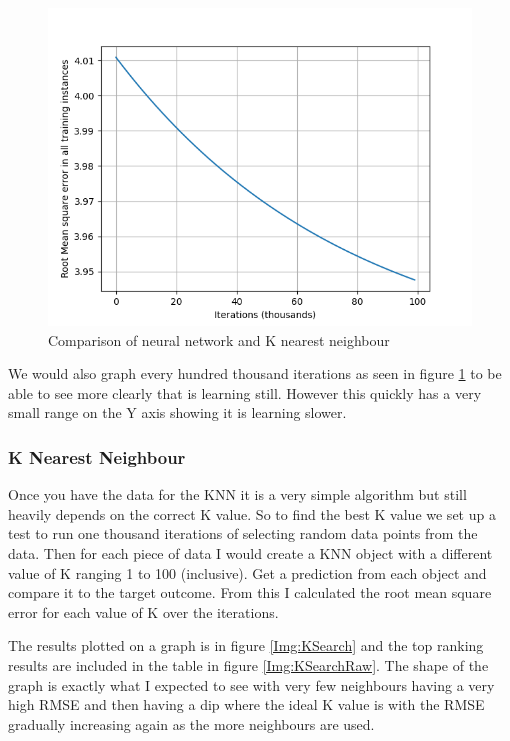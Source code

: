\documentclass[11pt]{article}
\begin{document}
	 \begin{figure}[!htb]
	 	\centering
	 		\includegraphics{Resources/PartTwo/LearningGraphs/20220111_184633_1000_1.png}
	 		\caption{Comparison of neural network and K nearest neighbour}
	 		\label{Img:NNTrainB}
	 \end{figure}

 	We would also graph every hundred thousand iterations  as seen in figure \ref{Img:NNTrainB} to be able to see more clearly that is learning still. However this quickly has a very small range on the Y axis showing it is learning slower.

	\subsubsection{K Nearest Neighbour}
	Once you have the data for the KNN it is a very simple algorithm but still heavily depends on the correct K value. So to find the best K value we set up a test to run one thousand iterations of selecting random data points from the data. Then for each piece of data I would create a KNN object with a different value of K ranging 1 to 100 (inclusive). Get a prediction from each object and compare it to the target outcome. From this I calculated the root mean square error for each value of K over the iterations.

	The results plotted on a graph is in figure \ref{Img:KSearch} and the top ranking results are included in the table in figure \ref{Img:KSearchRaw}.
	The shape of the graph is exactly what I expected to see with very few neighbours having a very high RMSE and then having a dip where the ideal K value is with the RMSE gradually increasing again as the more neighbours are used.
\end{document}
